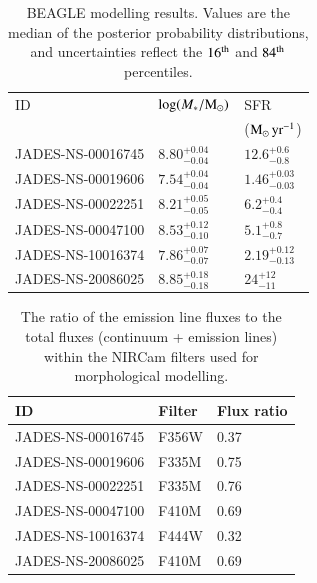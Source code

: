 \documentclass[longauth]{aa}
\newcommand{\Msun}{\rm M_\odot}
\begin{document}
\begin{appendix}
\begin{table}[h]
    \caption{BEAGLE modelling results. Values are the median of the posterior probability distributions, and uncertainties reflect the $16^{\rm th}$ and $84^{\rm th}$ percentiles.  }
    \centering
    \renewcommand{\arraystretch}{1.3}
    \begin{tabular}{l l l }
    \hline \hline
       ID &   $\log(M_*/\Msun)$ & SFR  \\
         & &  ($\Msun\,{\rm yr}^{-1}$) \\ 
        \hline
        JADES-NS-00016745 & $8.80_{-0.04}^{+0.04}$ & $12.6_{-0.8}^{+0.6}$ \\
        JADES-NS-00019606 & $7.54_{-0.04}^{+0.04}$ & $1.46_{-0.03}^{+0.03}$ \\
        JADES-NS-00022251 & $8.21_{-0.05}^{+0.05}$ & $6.2_{-0.4}^{+0.4}$ \\
        JADES-NS-00047100 & $8.53_{-0.10}^{+0.12}$ & $5.1_{-0.7}^{+0.8}$ \\        
        JADES-NS-10016374 & $7.86_{-0.07}^{+0.07}$ & $2.19_{-0.13}^{+0.12}$ \\
        JADES-NS-20086025 & $8.85_{-0.18}^{+0.18}$ & $24_{-11}^{+12}$ \\
    \hline
    \end{tabular}

    \label{tab:beagle}
\end{table}

\begin{table}[h]
    \caption{The ratio of the emission line fluxes to the total fluxes (continuum + emission lines) within the NIRCam filters used for morphological modelling.  }
    \centering
    \renewcommand{\arraystretch}{1.3}
    \begin{tabular}{l l l }
    \hline \hline
       ID &   Filter & Flux ratio  \\
        \hline
        JADES-NS-00016745 & F356W & 0.37 \\
        JADES-NS-00019606 & F335M & 0.75 \\
        JADES-NS-00022251 & F335M & 0.76 \\
        JADES-NS-00047100 & F410M & 0.69 \\        
        JADES-NS-10016374 & F444W & 0.32 \\
        JADES-NS-20086025 & F410M & 0.69 \\
    \hline
    \end{tabular}

    \label{tab:nircam_fluxes}
\end{table}

    
\end{appendix}
\end{document}

